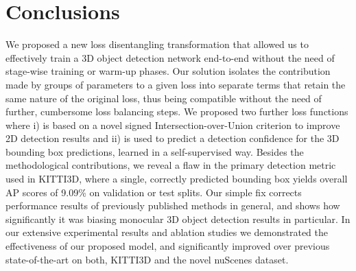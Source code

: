 \documentclass[10pt,twocolumn,letterpaper]{article}
\begin{document}
\section{Conclusions}
We proposed a new loss disentangling transformation that allowed us to effectively train a 3D object detection network end-to-end without the need of stage-wise training or warm-up phases. Our solution isolates the contribution made by groups of parameters to a given loss into separate terms that retain the same nature of the original loss, thus being compatible without the need of further, cumbersome loss balancing steps. We proposed two further loss functions where i) is based on a novel signed Intersection-over-Union criterion to improve 2D detection results and ii) is used to predict a detection confidence for the 3D bounding box predictions, learned in a self-supervised way. Besides the methodological contributions, we reveal a flaw in the primary detection metric used in KITTI3D, where a single, correctly predicted bounding box yields overall AP scores of 9.09\% on validation or test splits. Our simple fix corrects performance results of previously published methods in general, and shows how significantly it was biasing monocular 3D object detection results in particular. In our extensive experimental results and ablation studies we demonstrated the effectiveness of our proposed model, and significantly improved over previous state-of-the-art on both, KITTI3D and the novel nuScenes dataset.

\appendix
\end{document}

